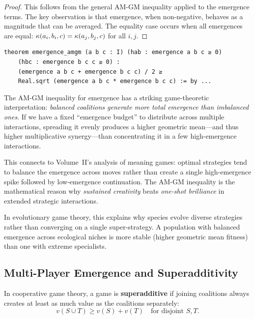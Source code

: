 \begin{proof}
This follows from the general AM-GM inequality applied to the emergence terms.
The key observation is that emergence, when non-negative, behaves as a
magnitude that can be averaged. The equality case occurs when all emergences
are equal: $\kappa(a_i, b_i, c) = \kappa(a_j, b_j, c)$ for all $i, j$.
\end{proof}

\begin{lstlisting}[caption={AM-GM inequality for emergence (IDT\_v3\_Emergence.lean)}]
theorem emergence_amgm (a b c : I) (hab : emergence a b c ≥ 0)
    (hbc : emergence b c c ≥ 0) :
    (emergence a b c + emergence b c c) / 2 ≥
    Real.sqrt (emergence a b c * emergence b c c) := by ...
\end{lstlisting}

\begin{interpretation}
The AM-GM inequality for emergence has a striking game-theoretic interpretation:
\emph{balanced coalitions generate more total emergence than imbalanced ones}.
If we have a fixed ``emergence budget'' to distribute across multiple
interactions, spreading it evenly produces a higher geometric mean---and thus
higher multiplicative synergy---than concentrating it in a few high-emergence
interactions.

This connects to Volume~II's analysis of meaning games: optimal strategies
tend to balance the emergence across moves rather than create a single
high-emergence spike followed by low-emergence continuation. The AM-GM
inequality is the mathematical reason why \emph{sustained creativity} beats
\emph{one-shot brilliance} in extended strategic interactions.

In evolutionary game theory, this explains why species evolve diverse
strategies rather than converging on a single super-strategy. A population
with balanced emergence across ecological niches is more stable (higher
geometric mean fitness) than one with extreme specialists.
\end{interpretation}

\subsection{Multi-Player Emergence and Superadditivity}

In cooperative game theory, a game is \textbf{superadditive} if joining
coalitions always creates at least as much value as the coalitions separately:
\[
  v(S \cup T) \geq v(S) + v(T) \quad \text{for disjoint } S, T.
\]

